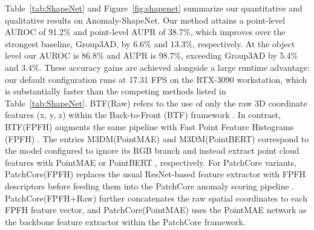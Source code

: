 Table~\ref{tab:ShapeNet} and Figure~\ref{fig:shapenet} summarize our quantitative and qualitative results on Anomaly-ShapeNet. Our method attains a point-level AUROC of 91.2\% and point-level AUPR of 38.7\%, which improves over the strongest baseline, Group3AD, by 6.6\% and 13.3\%, respectively. At the object level our AUROC is 86.8\% and AUPR is 98.7\%, exceeding Group3AD by 5.4\% and 3.4\%. These accuracy gains are achieved alongside a large runtime advantage: our default configuration runs at 17.31 FPS on the RTX-3090 workstation, which is substantially faster than the competing methods listed in Table~\ref{tab:ShapeNet}. BTF(Raw) refers to the use of only the raw 3D coordinate features (x, y, z) within the Back-to-Front (BTF) framework \cite{horwitz2023back}. In contrast, BTF(FPFH) augments the same pipeline with Fast Point Feature Histograms (FPFH) \cite{rusu2009fast}. The entries M3DM(PointMAE) and M3DM(PointBERT) correspond to the model \cite{wang2023multimodal} configured to ignore its RGB branch and instead extract point cloud features with PointMAE \cite{pang2022masked} or PointBERT \cite{yu2022point}, respectively. For PatchCore variants, PatchCore(FPFH) replaces the usual ResNet-based feature extractor with FPFH descriptors \cite{rusu2009fast} before feeding them into the PatchCore anomaly scoring pipeline \cite{roth2022towards}. PatchCore(FPFH+Raw) further concatenates the raw spatial coordinates to each FPFH feature vector, and PatchCore(PointMAE) uses the PointMAE network \cite{pang2022masked} as the backbone feature extractor within the PatchCore framework.

